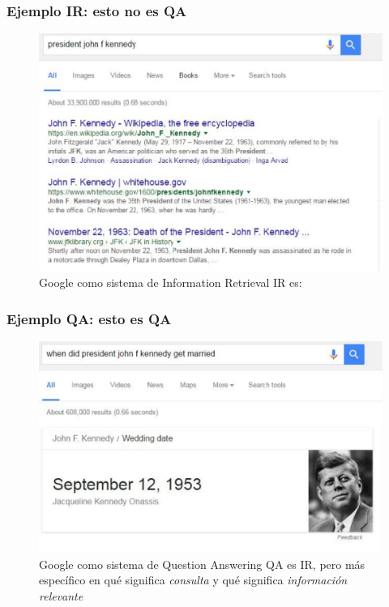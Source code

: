 \begin{frame}
\frametitle{Ejemplo IR: esto no es QA}
\begin{figure}
  \centering
    \includegraphics[scale=.4]{graficos/i-r-example}
  \caption{Google como sistema de Information Retrieval \newline \tiny{IR es: }}
  \label{fig:qa-example}
\end{figure}

\end{frame}


\begin{frame}
\frametitle{Ejemplo QA: esto es QA}
\begin{figure}
  \centering
    \includegraphics[scale=.5]{graficos/q-a-example}
  \caption{Google como sistema de Question Answering \newline \tiny{QA es IR, pero más específico en qué significa \textit{consulta} y qué significa \textit{información relevante}}}
  \label{fig:qa-example}
\end{figure}
  
\end{frame}


